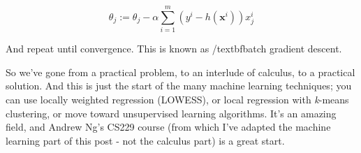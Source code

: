 \documentclass{article}
\begin{document}
\begin{equation}
\theta_{j} := \theta_{j} - \alpha \sum_{i=1}^{m} (y^{i} - h(\textbf{x}^{i})) x_{j}^{i}
\end{equation}

And repeat until convergence. This is known as /textbf{batch gradient descent}.

So we've gone from a practical problem, to an interlude of calculus, to a practical solution. And this is just the start of the many machine learning techniques; you can use locally weighted regression (LOWESS), or local regression with \textit{k}-means clustering, or move toward unsupervised learning algorithms. It's an amazing field, and Andrew Ng's CS229 course (from which I've adapted the machine learning part of this post - not the calculus part) is a great start.
\end{document}
